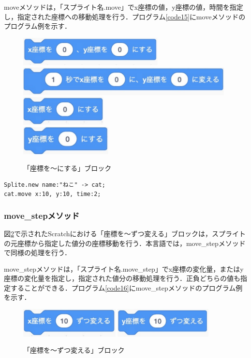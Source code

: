 \documentclass[10pt,a4j]{ltjsarticle}
\begin{document}
moveメソッドは，「スプライト名.move」でx座標の値，y座標の値，時間を指定し，指定された座標への移動処理を行う．プログラム\ref{code15}にmoveメソッドのプログラム例を示す．

\begin{figure}[H]
  \centering
  \includegraphics[height=15mm]{images/move_x_y.pdf} \\
  \includegraphics[height=15mm]{images/move_x_y_time.pdf} \\
  \includegraphics[height=15mm]{images/move_x.pdf} \\
  \includegraphics[height=15mm]{images/move_y.pdf} 
  \caption{「座標を〜にする」ブロック}
  \label{fig:move}
\end{figure}

\begin{lstlisting}[caption=moveメソッドのプログラム例, label=code15]
Splite.new name:"ねこ" -> cat;
cat.move x:10, y:10, time:2; 
\end{lstlisting}

\subsubsection{move\_stepメソッド}
図\ref{fig:step}で示されたScratchにおける「座標を〜ずつ変える」ブロックは，スプライトの元座標から指定した値分の座標移動を行う．本言語では，move\_stepメソッドで同様の処理を行う．

move\_stepメソッドは，「スプライト名.move\_step」でx座標の変化量，またはy座標の変化量を指定し，指定された値分の移動処理を行う．正負どちらの値も指定することができる．プログラム\ref{code16}にmove\_stepメソッドのプログラム例を示す．

\begin{figure}[H]
  \centering
  \includegraphics[height=15mm]{images/step_x.pdf} 
  \includegraphics[height=15mm]{images/step_y.pdf} 
  \caption{「座標を〜ずつ変える」ブロック}
  \label{fig:step}
\end{figure}
\end{document}

